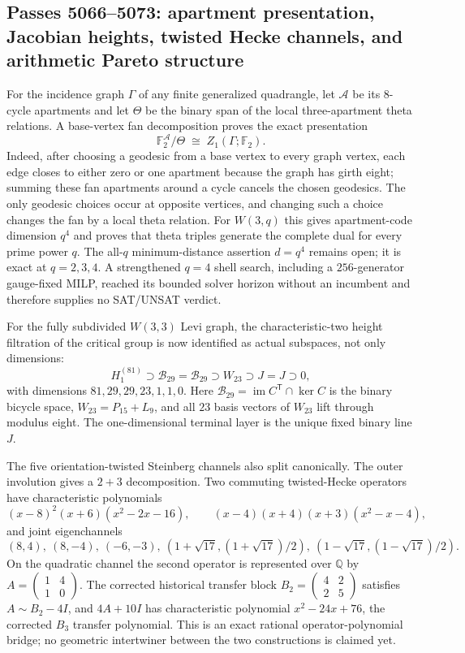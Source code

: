 \ifdefined\WPassFiveZeroSixSixLoaded\else
\gdef\WPassFiveZeroSixSixLoaded{1}
\subsection*{Passes 5066--5073: apartment presentation, Jacobian heights, twisted Hecke channels, and arithmetic Pareto structure}
For the incidence graph $\Gamma$ of any finite generalized quadrangle, let $\mathcal A$ be its $8$-cycle apartments and let $\Theta$ be the binary span of the local three-apartment theta relations.  A base-vertex fan decomposition proves the exact presentation
\[
 \mathbb F_2^{\mathcal A}/\Theta\;\cong\; Z_1(\Gamma;\mathbb F_2).
\]
Indeed, after choosing a geodesic from a base vertex to every graph vertex, each edge closes to either zero or one apartment because the graph has girth eight; summing these fan apartments around a cycle cancels the chosen geodesics.  The only geodesic choices occur at opposite vertices, and changing such a choice changes the fan by a local theta relation.  For $W(3,q)$ this gives apartment-code dimension $q^4$ and proves that theta triples generate the complete dual for every prime power $q$.  The all-$q$ minimum-distance assertion $d=q^4$ remains open; it is exact at $q=2,3,4$.  A strengthened $q=4$ shell search, including a $256$-generator gauge-fixed MILP, reached its bounded solver horizon without an incumbent and therefore supplies no SAT/UNSAT verdict.

For the fully subdivided $W(3,3)$ Levi graph, the characteristic-two height filtration of the critical group is now identified as actual subspaces, not only dimensions:
\[
 H_1^{(81)}\supset \mathcal B_{29}=\mathcal B_{29}\supset W_{23}\supset J=J\supset0,
\]
with dimensions $81,29,29,23,1,1,0$.  Here $\mathcal B_{29}=\operatorname{im}C^{\mathsf T}\cap\ker C$ is the binary bicycle space, $W_{23}=P_{15}+L_9$, and all $23$ basis vectors of $W_{23}$ lift through modulus eight.  The one-dimensional terminal layer is the unique fixed binary line $J$.

The five orientation-twisted Steinberg channels also split canonically.  The outer involution gives a $2+3$ decomposition.  Two commuting twisted-Hecke operators have characteristic polynomials
\[
 (x-8)^2(x+6)(x^2-2x-16),\qquad
 (x-4)(x+4)(x+3)(x^2-x-4),
\]
and joint eigenchannels
\[
 (8,4),\ (8,-4),\ (-6,-3),\
 (1+\sqrt{17},(1+\sqrt{17})/2),\
 (1-\sqrt{17},(1-\sqrt{17})/2).
\]
On the quadratic channel the second operator is represented over $\mathbb Q$ by $A=\left(\begin{smallmatrix}1&4\\1&0\end{smallmatrix}\right)$.  The corrected historical transfer block $B_2=\left(\begin{smallmatrix}4&2\\2&5\end{smallmatrix}\right)$ satisfies $A\sim B_2-4I$, and $4A+10I$ has characteristic polynomial $x^2-24x+76$, the corrected $B_3$ transfer polynomial.  This is an exact rational operator-polynomial bridge; no geometric intertwiner between the two constructions is claimed yet.

